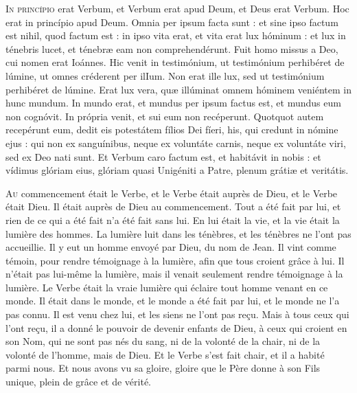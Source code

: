 \documentclass[%
fontsize=10%
,a5paper%
,DIV=15%
]{scrartcl}
\title{\centrer{Sacrement de Mariage suivi de la messe}}
\author{}
\date{}
\newcommand{\maversio}[3][1]{%
	{
	\parindent=0pt
	\begin{paracol}{2}
	\ensurevspace{#1\baselineskip}
	\switchcolumn\switchcolumn*
 	 #2\looseness=-1 
	\switchcolumn
	 #3\looseness=-1 
	\end{paracol}%
	
	}}
\begin{document}
	
\maversio{
\lettrine[lhang=0, nindent=0pt, lines=3]{I}{n princípio} erat Verbum, et Verbum erat apud Deum, et Deus erat Verbum. Hoc erat in princípio apud Deum. Omnia per ipsum facta sunt : et sine ipso factum est nihil, quod factum est : in ipso vita erat, et vita erat lux hóminum : et lux in ténebris lucet, et ténebræ eam non comprehendérunt. Fuit homo missus a Deo, cui nomen erat Ioánnes. Hic venit in testimónium, ut testimónium perhibéret de lúmine, ut omnes créderent per ilIum. Non erat ille lux, sed ut testimónium perhibéret de lúmine. Erat lux vera, quæ illúminat omnem hóminem veniéntem in hunc mundum. In mundo erat, et mundus per ipsum factus est, et mundus eum non cognóvit. In própria venit, et sui eum non recéperunt. Quotquot autem recepérunt eum, dedit eis potestátem fílios Dei fíeri, his, qui credunt in nómine ejus : qui non ex sanguínibus, neque ex voluntáte carnis, neque ex voluntáte viri, sed ex Deo nati sunt. Et Verbum caro factum est, et habitávit in nobis : et vídimus glóriam eius, glóriam quasi Unigéniti a Patre, plenum grátiæ et veritátis.
}{
\lettrine[lhang=0, nindent=0pt, lines=3]{A}{u} commencement était le Verbe, et le Verbe était auprès de Dieu, et le Verbe était Dieu. Il était auprès de Dieu au commencement. Tout a été fait par lui, et rien de ce qui a été fait n'a été fait sans lui. En lui était la vie, et la vie était la lumière des hommes. La lumière luit dans les ténèbres, et les ténèbres ne l'ont pas accueillie. Il y eut un homme envoyé par Dieu, du nom de Jean. Il vint comme témoin, pour rendre témoignage à la lumière, afin que tous croient grâce à lui. Il n'était pas lui-même la lumière, mais il venait seulement rendre témoignage à la lumière. Le Verbe était la vraie lumière qui éclaire tout homme venant en ce monde. Il était dans le monde, et le monde a été fait par lui, et le monde ne l'a pas connu. Il est venu chez lui, et les siens ne l'ont pas reçu. Mais à tous ceux qui l'ont reçu, il a donné le pouvoir de devenir enfants de Dieu, à ceux qui croient en son Nom, qui ne sont pas nés du sang, ni de la volonté de la chair, ni de la volonté de l'homme, mais de Dieu. Et le Verbe s'est fait chair, et il a habité parmi nous. Et nous avons vu sa gloire, gloire que le Père donne à son Fils unique, plein de grâce et de vérité.}
\end{document}
